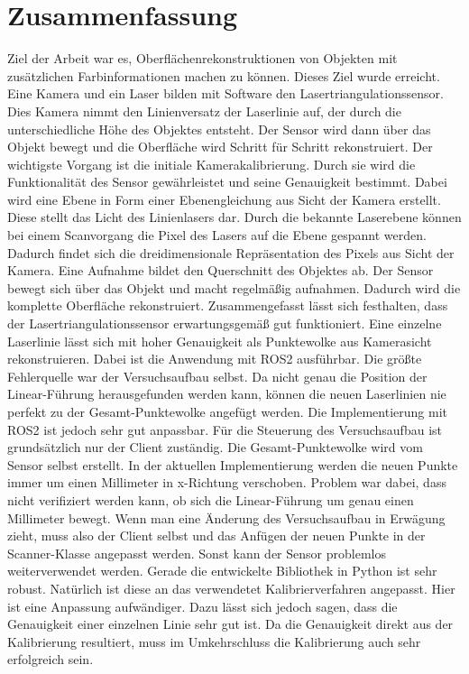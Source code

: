 \section{Zusammenfassung}\label{zusammenfassung}
	Ziel der Arbeit war es, Oberflächenrekonstruktionen von Objekten mit zusätzlichen Farbinformationen machen zu können. Dieses Ziel wurde erreicht. Eine Kamera und ein Laser bilden mit Software den Lasertriangulationssensor. Dies Kamera nimmt den Linienversatz der Laserlinie auf, der durch die unterschiedliche Höhe des Objektes entsteht. Der Sensor wird dann über das Objekt bewegt und die Oberfläche wird Schritt für Schritt rekonstruiert. Der wichtigste Vorgang ist die initiale Kamerakalibrierung. Durch sie wird die Funktionalität des Sensor gewährleistet und seine Genauigkeit bestimmt. Dabei wird eine Ebene in Form einer Ebenengleichung aus Sicht der Kamera erstellt. Diese stellt das Licht des Linienlasers dar. Durch die bekannte Laserebene können bei einem Scanvorgang die Pixel des Lasers auf die Ebene gespannt werden. Dadurch findet sich die dreidimensionale Repräsentation des Pixels aus Sicht der Kamera. Eine Aufnahme bildet den Querschnitt des Objektes ab. Der Sensor bewegt sich über das Objekt und macht regelmäßig aufnahmen. Dadurch wird die komplette Oberfläche rekonstruiert. \newline
	Zusammengefasst lässt sich festhalten, dass der Lasertriangulationssensor erwartungsgemäß gut funktioniert. Eine einzelne Laserlinie lässt sich mit hoher Genauigkeit als Punktewolke aus Kamerasicht rekonstruieren. Dabei ist die Anwendung mit ROS2 ausführbar. Die größte Fehlerquelle war der Versuchsaufbau selbst. Da nicht genau die Position der Linear-Führung herausgefunden werden kann, können die neuen Laserlinien nie perfekt zu der Gesamt-Punktewolke angefügt werden. Die Implementierung mit ROS2 ist jedoch sehr gut anpassbar. Für die Steuerung des Versuchsaufbau ist grundsätzlich nur der Client zuständig. Die Gesamt-Punktewolke wird vom Sensor selbst erstellt. In der aktuellen Implementierung werden die neuen Punkte immer um einen Millimeter in x-Richtung verschoben. Problem war dabei, dass nicht verifiziert werden kann, ob sich die Linear-Führung um genau einen Millimeter bewegt. Wenn man eine Änderung des Versuchsaufbau in Erwägung zieht, muss also der Client selbst und das Anfügen der neuen Punkte in der Scanner-Klasse angepasst werden. Sonst kann der Sensor problemlos weiterverwendet werden. Gerade die entwickelte Bibliothek in Python ist sehr robust. Natürlich ist diese an das verwendetet Kalibrierverfahren angepasst. Hier ist eine Anpassung aufwändiger. Dazu lässt sich jedoch sagen, dass die Genauigkeit einer einzelnen Linie sehr gut ist. Da die Genauigkeit direkt aus der Kalibrierung resultiert, muss im Umkehrschluss die Kalibrierung auch sehr erfolgreich sein. \newline
